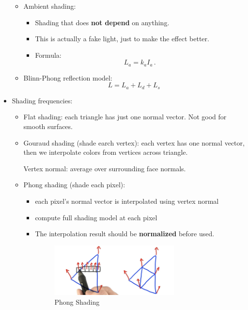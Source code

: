 \documentclass{article}
\begin{document}
\begin{itemize}
\begin{itemize}
    \item Ambient shading:
    \begin{itemize}
        \item Shading that does \textbf{not depend} on anything. 
        \item This is actually a fake light, just to make the effect better.
        \item Formula:
        $$
        L_a = k_a I_a\,.
        $$
    \end{itemize}
    
    \item Blinn-Phong reflection model:
    $$
    L = L_a + L_d + L_s
    $$
    \end{itemize}
    \newpage
    \item Shading frequencies:
    
    \begin{itemize}
        \item Flat shading: each triangle has just one normal vector. Not good for smooth surfaces.
        \item Gouraud shading (shade earch vertex): each vertex has one normal vector, then we interpolate colors from vertices across triangle.
        
        Vertex normal: average over surrounding face normals. 
        \item Phong shading (shade each pixel): 
        \begin{itemize}
            \item each pixel's normal vector is interpolated using vertex normal
            \item compute full shading model at each pixel
            \item The interpolation result should be \textbf{normalized} before used.
            \begin{figure}[H]
                \centering
                \includegraphics[width=0.7\textwidth]{imgs/phong_shade.png}
                \caption{Phong Shading}

            \end{figure}
            

\end{itemize}
\end{itemize}
\end{itemize}
\end{document}
